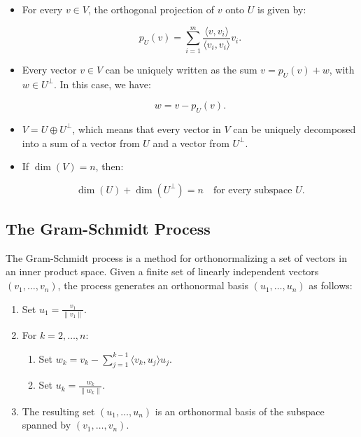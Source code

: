 \begin{itemize}
    \item For every \( v \in V \), the orthogonal projection of \( v \) onto \( U \) is given by:
        
          \[
               p_U(v) = \sum_{i=1}^{m} \frac{\langle v, v_i \rangle}{\langle v_i, v_i \rangle} v_i.
          \]

    \item Every vector \( v \in V \) can be uniquely written as the sum \( v = p_U(v) + w \), with 
          \( w \in U^\perp \). In this case, we have:
          
          \[
               w = v - p_U(v).
          \]

    \item \( V = U \oplus U^\perp \), which means that every vector in \( V \) can be uniquely 
          decomposed into a sum of a vector from \( U \) and a vector from \( U^\perp \).

    \item If \( \dim(V) = n \), then:
  
          \[
               \dim(U) + \dim(U^\perp) = n \quad \text{for every subspace } U.
          \]
\end{itemize}

\subsection{The Gram-Schmidt Process}

The Gram-Schmidt process is a method for orthonormalizing a set of vectors in an inner product space. 
Given a finite set of linearly independent vectors \( (v_1, \ldots, v_n) \), the process generates an orthonormal basis \( (u_1, \ldots, u_n) \) as follows:

\begin{enumerate}

    \item Set \( u_1 = \frac{v_1}{\|v_1\|} \).
    
    \item For \( k = 2, \ldots, n \):

    \begin{enumerate}
        \item Set \( w_k = v_k - \sum_{j=1}^{k-1} \langle v_k, u_j \rangle u_j \).
        \item Set \( u_k = \frac{w_k}{\|w_k\|} \).
    \end{enumerate}

    \item The resulting set \( (u_1, \ldots, u_n) \) is an orthonormal basis of the subspace spanned 
          by \( (v_1, \ldots, v_n) \).

        \end{enumerate}

